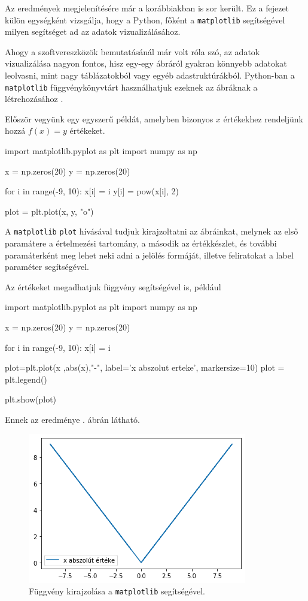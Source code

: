 
Az eredmények megjelenítésére már a korábbiakban is sor került. Ez a fejezet külön egységként vizsgálja, hogy a Python, főként a \texttt{matplotlib} segítségével milyen segítséget ad az adatok vizualizálásához.

    
Ahogy a szoftvereszközök bemutatásánál már volt róla szó, az adatok
vizualizálása nagyon fontos, hisz egy-egy ábráról gyakran könnyebb adatokat
leolvasni, mint nagy táblázatokból vagy egyéb adastruktúrákból.
Python-ban a \texttt{matplotlib} függvénykönyvtárt használhatjuk ezeknek az ábráknak a
létrehozásához \cite{matplotlib}.

    Először vegyünk egy egyszerű példát, amelyben bizonyos \(x\) értékekhez
rendeljünk hozzá \(f(x) = y\) értékeket.
\begin{python}
import matplotlib.pyplot as plt
import numpy as np

x = np.zeros(20)
y = np.zeros(20)

for i in range(-9, 10):
    x[i] = i
    y[i] = pow(x[i], 2)
    
plot = plt.plot(x, y, "o")
\end{python}
    A \texttt{matplotlib} \texttt{plot} hívásával tudjuk kirajzoltatni az
ábráinkat, melynek az első paramátere a értelmezési tartomány, a második
az értékkészlet, és további paramáterként meg lehet neki adni a jelölés
formáját, illetve feliratokat a label paraméter segítségével.

Az értékeket megadhatjuk függvény segítségével is, például
\begin{python}
import matplotlib.pyplot as plt
import numpy as np

x = np.zeros(20)
y = np.zeros(20)

for i in range(-9, 10):
    x[i] = i
    
plot=plt.plot(x ,abs(x),"-", label='x abszolut erteke', markersize=10)
plot = plt.legend()

plt.show(plot)
\end{python}
Ennek az eredménye . ábrán látható.

\begin{figure}[h!]
\centering
\includegraphics[scale=1.0]{img/abs-plot.png}
\caption{Függvény kirajzolása a \texttt{matplotlib} segítségével.}
\label{fig:abs-plot}
\end{figure}

